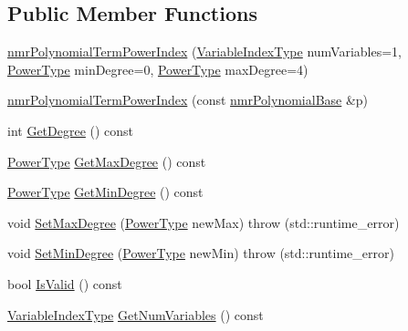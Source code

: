 \subsection*{Public Member Functions}
\begin{DoxyCompactItemize}
\item 
\hyperlink{classnmr_polynomial_term_power_index_a228f57fb006939574201fda8ca3237c3}{nmr\-Polynomial\-Term\-Power\-Index} (\hyperlink{classnmr_polynomial_term_power_index_ac982d5f82c3a95968e92d54c92cbc3e0}{Variable\-Index\-Type} num\-Variables=1, \hyperlink{classnmr_polynomial_term_power_index_a2eec01c3a2c3f56f47982ceffd8e36ed}{Power\-Type} min\-Degree=0, \hyperlink{classnmr_polynomial_term_power_index_a2eec01c3a2c3f56f47982ceffd8e36ed}{Power\-Type} max\-Degree=4)
\item 
\hyperlink{classnmr_polynomial_term_power_index_aa4a8ecd01e40b76a4fd20d58773ac375}{nmr\-Polynomial\-Term\-Power\-Index} (const \hyperlink{classnmr_polynomial_base}{nmr\-Polynomial\-Base} \&p)
\item 
int \hyperlink{classnmr_polynomial_term_power_index_ad74e09241ad425d80c7c4ccbe9e8d7dd}{Get\-Degree} () const 
\item 
\hyperlink{classnmr_polynomial_term_power_index_a2eec01c3a2c3f56f47982ceffd8e36ed}{Power\-Type} \hyperlink{classnmr_polynomial_term_power_index_ad8e4cb46dab70a93b56c4ce42f9eded1}{Get\-Max\-Degree} () const 
\item 
\hyperlink{classnmr_polynomial_term_power_index_a2eec01c3a2c3f56f47982ceffd8e36ed}{Power\-Type} \hyperlink{classnmr_polynomial_term_power_index_a0474a1274dbedfe5ff5b4830f4e6c47f}{Get\-Min\-Degree} () const 
\item 
void \hyperlink{classnmr_polynomial_term_power_index_a7258a386411761862e9ab455cc107e23}{Set\-Max\-Degree} (\hyperlink{classnmr_polynomial_term_power_index_a2eec01c3a2c3f56f47982ceffd8e36ed}{Power\-Type} new\-Max)  throw (std\-::runtime\-\_\-error)
\item 
void \hyperlink{classnmr_polynomial_term_power_index_a484a45cda96657835b5137b18c13ae0b}{Set\-Min\-Degree} (\hyperlink{classnmr_polynomial_term_power_index_a2eec01c3a2c3f56f47982ceffd8e36ed}{Power\-Type} new\-Min)  throw (std\-::runtime\-\_\-error)
\item 
bool \hyperlink{classnmr_polynomial_term_power_index_afe6a8231affbcb38890f7e33cabdb59c}{Is\-Valid} () const 
\item 
\hyperlink{classnmr_polynomial_term_power_index_ac982d5f82c3a95968e92d54c92cbc3e0}{Variable\-Index\-Type} \hyperlink{classnmr_polynomial_term_power_index_a7b3cc89f51a30def066491115af27737}{Get\-Num\-Variables} () const 

\end{DoxyCompactItemize}
